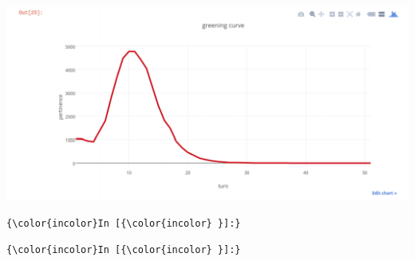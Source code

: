 \includegraphics[width=\textwidth,height=\textheight,keepaspectratio]{p4}\\

\begin{Verbatim}[commandchars=\\\{\}]
  {\color{incolor}In [{\color{incolor} }]:}
\end{Verbatim}

\begin{Verbatim}[commandchars=\\\{\}]
  {\color{incolor}In [{\color{incolor} }]:}
\end{Verbatim}
